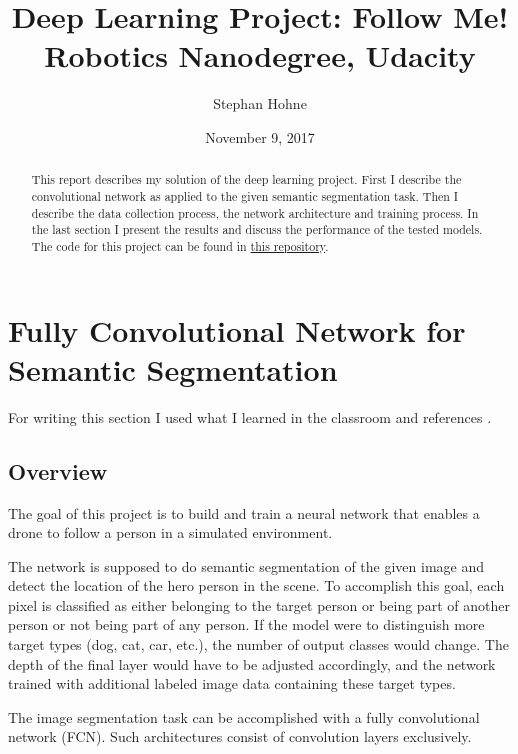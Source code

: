 \documentclass[11pt, onecolumn, oneside, reqno]{article}
\title{Deep Learning Project: Follow Me! \\ Robotics Nanodegree, Udacity}
\author{Stephan Hohne}
\date{November 9, 2017}
\begin{document}
\maketitle

\begin{abstract}
This report describes my solution of the deep learning project. First I describe the convolutional network as applied to the given semantic segmentation task. Then I describe the data collection process, the network architecture and training process. In the last section I present the results and discuss the performance of the tested models. The code for this project can be found in \href{https://github.com/S2H-Mobile/RoboND-DeepLearning-Project-Solution}{this repository}.
\end{abstract}

\tableofcontents

\newpage

\listoftables

\listoffigures

\newpage

\section{Fully Convolutional Network for Semantic Segmentation}
\label{sec:fcn_description}
For writing this section I used what I learned in the classroom and references \cite{CS231n, Xception, MobileNets}.

\subsection{Overview}
The goal of this project is to build and train a neural network that enables a drone to follow a person in a simulated environment.

The network is supposed to do semantic segmentation of the given image and detect the location of the hero person in the scene. To accomplish this goal, each pixel is classified as either belonging to the target person or being part of another person or not being part of any person. If the model were to distinguish more target types (dog, cat, car, etc.), the number of output classes would change. The depth of the final layer would have to be adjusted accordingly, and the network trained with additional labeled image data containing these target types.

The image segmentation task can be accomplished with a fully convolutional network (FCN). Such architectures consist of convolution layers exclusively.
\end{document}
